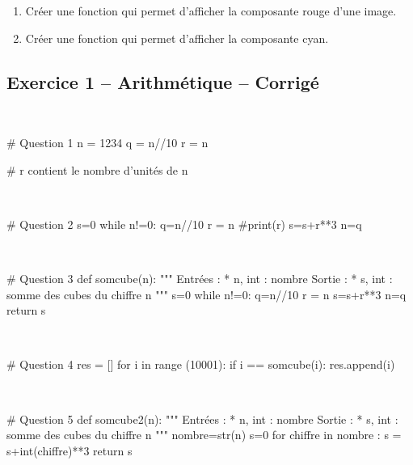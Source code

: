 \documentclass[10pt,fleqn]{article} %
\begin{document}
\begin{multicols}{2}
\begin{enumerate}
\item Créer une fonction qui permet d'afficher la composante rouge d'une image. 
\item Créer une fonction qui permet d'afficher la composante cyan.
\end{enumerate}

\newpage





\subsection*{Exercice 1 -- Arithmétique -- Corrigé}

\begin{corrige}
$\quad$
\begin{python}
# Question 1
n = 1234
q = n//10
r =  n%

# r contient le nombre d'unités de n
\end{python}
\end{corrige}

\begin{corrige}
$\quad$
\begin{python}
# Question 2
s=0
while n!=0:
    q=n//10
    r = n%
    #print(r)
    s=s+r**3
    n=q
\end{python}
\end{corrige}

\begin{corrige}
$\quad$
\begin{python}
# Question 3
def somcube(n):
    """
    Entrées :
     * n, int : nombre
    Sortie : 
     * s, int : somme des cubes du chiffre n
    """
    s=0
    while n!=0:
        q=n//10
        r = n%
        s=s+r**3
        n=q
    return s
\end{python}
\end{corrige}

\begin{corrige}
$\quad$
\begin{python}
# Question 4
res = []
for i in range (10001):
    if i == somcube(i):
        res.append(i)
\end{python}
\end{corrige}

\begin{corrige}
$\quad$
\begin{python}
# Question 5
def somcube2(n):
    """
    Entrées :
     * n, int : nombre
    Sortie : 
     * s, int : somme des cubes du chiffre n
    """
    nombre=str(n)
    s=0
    for chiffre in nombre :
        s = s+int(chiffre)**3
    return s
    

\end{python}
\end{corrige}
\end{multicols}
\end{document}

